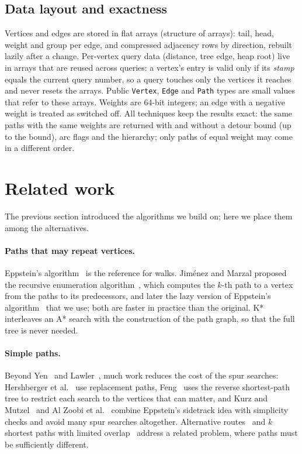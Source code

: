 \documentclass[11pt,a4paper]{article}
\begin{document}
\subsection{Data layout and exactness}
Vertices and edges are stored in flat arrays (structure of arrays): tail, head, weight and group per edge, and
compressed adjacency rows by direction, rebuilt lazily after a change. Per-vertex query data (distance, tree edge,
heap root) live in arrays that are reused across queries: a vertex's entry is valid only if its \emph{stamp} equals
the current query number, so a query touches only the vertices it reaches and never resets the arrays. Public
\texttt{Vertex}, \texttt{Edge} and \texttt{Path} types are small values that refer to these arrays. Weights are
64-bit integers; an edge with a negative weight is treated as switched off. All techniques keep the results exact:
the same paths with the same weights are returned with and without a detour bound (up to the bound), arc flags and
the hierarchy; only paths of equal weight may come in a different order.

\section{Related work}\label{sec:related}

The previous section introduced the algorithms we build on; here we place them among the alternatives.

\paragraph{Paths that may repeat vertices.} Eppstein's algorithm~\cite{eppstein1998} is the reference for walks.
Jiménez and Marzal proposed the recursive enumeration algorithm~\cite{jimenez1999}, which computes the $k$-th path
to a vertex from the paths to its predecessors, and later the lazy version of Eppstein's
algorithm~\cite{jimenez2003} that we use; both are faster in practice than the original. K*~\cite{aljazzar2011}
interleaves an A* search with the construction of the path graph, so that the full tree is never needed.

\paragraph{Simple paths.} Beyond Yen~\cite{yen1971} and Lawler~\cite{lawler1972}, much work reduces the cost of the
spur searches: Hershberger et al.~\cite{hershberger2007} use replacement paths, Feng~\cite{feng2014} uses the
reverse shortest-path tree to restrict each search to the vertices that can matter, and Kurz and
Mutzel~\cite{kurz2016} and Al Zoobi et al.~\cite{alzoobi2023} combine Eppstein's sidetrack idea with simplicity
checks and avoid many spur searches altogether. Alternative routes~\cite{abraham2013} and $k$ shortest paths with
limited overlap~\cite{chondrogiannis2020} address a related problem, where paths must be sufficiently different.
\end{document}
